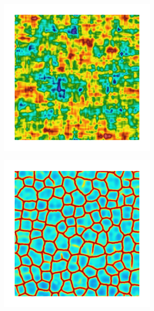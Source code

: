 \begin{figure}[!htb]
\begin{subfigure}[b]{0.15\textwidth}
    \caption{}
    \label{fig: Chapter4/2D/Gc_exp_cartesian_5_5_rho_0_seed_e}
  \end{subfigure}
  \begin{subfigure}[b]{0.15\textwidth}
    \includegraphics[width=\textwidth]{Chapter4/figures/2D/psic_exp_cartesian_5_5_rho_0_seed_e.png}
    \caption{}
    \label{fig: Chapter4/2D/psic_exp_cartesian_5_5_rho_0_seed_e}
  \end{subfigure}
  \begin{subfigure}[b]{0.15\textwidth}
    \includegraphics[width=\textwidth]{Chapter4/figures/2D/d_exp_cartesian_5_5_rho_0_seed_e.png}

\end{subfigure}
\end{figure}
